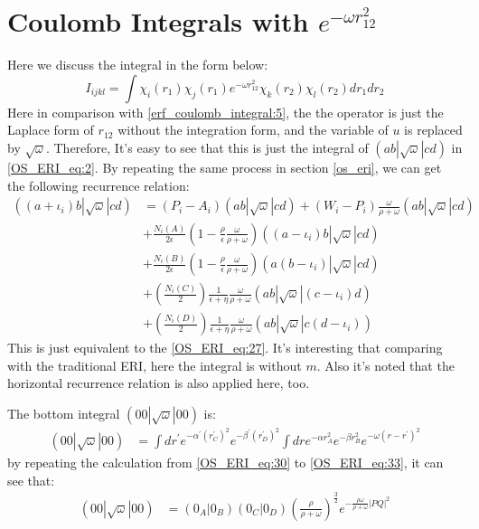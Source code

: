 \section{Coulomb Integrals with $e^{-\omega r_{12}^{2}}$}

Here we discuss the integral in the form below:
\begin{equation}\label{expr12_coulomb_integral:1}
 I_{ijkl} = \int \chi_{i}(r_{1})\chi_{j}(r_{1})e^{-\omega r_{12}^{2}}
\chi_{k}(r_{2})\chi_{l}(r_{2}) dr_{1} dr_{2}
\end{equation}
Here in comparison with \ref{erf_coulomb_integral:5}, the the operator is just 
the Laplace form of $r_{12}$ without the integration form, and the variable
of $u$ is replaced by $\sqrt{\omega}$. Therefore, It's easy to see that this 
is just the integral of $(ab|\sqrt{\omega}|cd)$ in \ref{OS_ERI_eq:2}. By repeating
the same process in section \ref{os_eri}, we can get the following recurrence
relation:
\begin{equation}
 \begin{split}
((a+\iota_{i})b|\sqrt{\omega}|cd) &= (P_{i} - A_{i})(ab|\sqrt{\omega}|cd) +
\left(W_{i} -P_{i}\right)
\frac{\omega}{\rho+\omega}(ab|\sqrt{\omega}|cd) \\
&+\frac{N_{i}(A)}{2\epsilon}\left(1-\frac{\rho}{\epsilon}
\frac{\omega}{\rho+\omega}\right)
((a-\iota_{i})b|\sqrt{\omega}|cd) \\
&+\frac{N_{i}(B)}{2\epsilon}\left(1-\frac{\rho}{\epsilon}
\frac{\omega}{\rho+\omega}\right)
(a(b-\iota_{i})|\sqrt{\omega}|cd) \\
&+\left(\frac{N_{i}(C)}{2}\right)\frac{1}{\epsilon+\eta}\frac{\omega}
{\rho+\omega}(ab|\sqrt{\omega}|(c-\iota_{i})d) \\
&+\left(\frac{N_{i}(D)}{2}\right)\frac{1}{\epsilon+\eta}\frac{\omega}
{\rho+\omega}(ab|\sqrt{\omega}|c(d-\iota_{i}))
\end{split}
\label{expr12_coulomb_integral:2}
\end{equation}
This is just equivalent to the \ref{OS_ERI_eq:27}. It's interesting that comparing 
with the traditional ERI, here the integral is without $m$. Also it's noted that
the horizontal recurrence relation is also applied here, too.

The bottom integral $(00|\sqrt{\omega}|00)$ is:
\begin{equation}
 \begin{split}
 (00|\sqrt{\omega}|00) &= 
\int dr^{'}  e^{-\alpha^{'} (r^{'}_{C})^{2}}e^{-\beta^{'} (r^{'}_{D})^{2}} 
\int dr  e^{-\alpha r_{A}^{2}} e^{-\beta r_{B}^{2}} e^{-\omega(r-r^{'})^{2}} 
\end{split}
\label{expr12_coulomb_integral:3}
\end{equation}
by repeating the calculation from \ref{OS_ERI_eq:30} to \ref{OS_ERI_eq:33}, it can
see that:
\begin{equation}
 \begin{split}
 (00|\sqrt{\omega}|00) &= (0_{A}|0_{B})(0_{C}|0_{D})
 \left(\frac{\rho}{\rho+\omega}\right)^{\frac{3}{2}}
 e^{-\frac{\rho \omega}{\rho+ \omega}|PQ|^{2}} 
\end{split}
\label{expr12_coulomb_integral:4}
\end{equation}